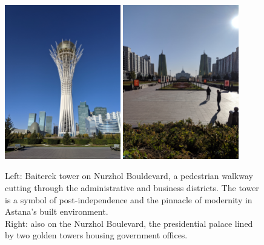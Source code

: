 \documentclass{article}
\begin{document}
\begin{figure}[h!]
	\centering
	\captionsetup{labelformat=empty}
	\includegraphics[width=0.45\textwidth]{astana_modernity}
	\includegraphics[width=0.45\textwidth]{astana_modernity15}
	\caption{Left: Baiterek tower on Nurzhol Bouldevard, a pedestrian walkway cutting through the administrative and business districts. The tower is a symbol of post-independence and the pinnacle of modernity in Astana's built environment.
	\\Right: also on the Nurzhol Boulevard, the presidential palace lined by two golden towers housing government offices.}
\end{figure}
\end{document}
